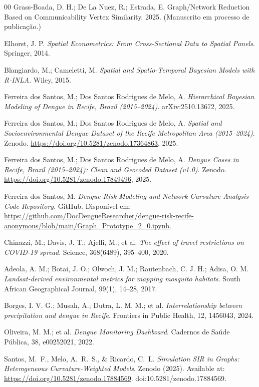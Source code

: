 \documentclass[final,3p,times,twocolumn]{elsarticle}
\begin{document}
\begin{thebibliography}{00}
Grass-Boada, D. H.; De La Nuez, R.; Estrada, E.
Graph/Network Reduction Based on Communicability Vertex Similarity.
2025. (Manuscrito em processo de publicação.)

Elhorst, J. P.
\textit{Spatial Econometrics: From Cross-Sectional Data to Spatial Panels}.
Springer, 2014.

Blangiardo, M.; Cameletti, M.
\textit{Spatial and Spatio-Temporal Bayesian Models with R-INLA}.
Wiley, 2015.

Ferreira dos Santos, M.; Dos Santos Rodrigues de Melo, A.
\textit{Hierarchical Bayesian Modeling of Dengue in Recife, Brazil (2015–2024)}.
arXiv:2510.13672, 2025.

Ferreira dos Santos, M.; Dos Santos Rodrigues de Melo, A.
\textit{Spatial and Socioenvironmental Dengue Dataset of the Recife Metropolitan Area (2015–2024)}.
Zenodo. \url{https://doi.org/10.5281/zenodo.17364863}, 2025.

Ferreira dos Santos, M.; Dos Santos Rodrigues de Melo, A.
\textit{Dengue Cases in Recife, Brazil (2015–2024): Clean and Geocoded Dataset (v1.0)}.
Zenodo. \url{https://doi.org/10.5281/zenodo.17849496}, 2025.

Ferreira dos Santos, M.
\textit{Dengue Risk Modeling and Network Curvature Analysis – Code Repository}.
GitHub. Disponível em:
\url{https://github.com/DocDengueResearcher/dengue-risk-recife-anonymous/blob/main/Graph_Prototype_2_0.ipynb}.

Chinazzi, M.; Davis, J. T.; Ajelli, M.; et al.
\textit{The effect of travel restrictions on COVID-19 spread}.
Science, 368(6489), 395--400, 2020.

Adeola, A. M.; Botai, J. O.; Olwoch, J. M.; Rautenbach, C. J. H.; Adisa, O. M.
\textit{Landsat-derived environmental metrics for mapping mosquito habitats}.
South African Geographical Journal, 99(1), 14--28, 2017.

Borges, I. V. G.; Musah, A.; Dutra, L. M. M.; et al.
\textit{Interrelationship between precipitation and dengue in Recife}.
Frontiers in Public Health, 12, 1456043, 2024.

Oliveira, M. M.; et al.
\textit{Dengue Monitoring Dashboard}.
Cadernos de Saúde Pública, 38, e00252021, 2022.

Santos, M.~F., Melo, A.~R.~S., \& Ricardo, C.~L.
\newblock \emph{Simulation SIR in Graphs: Heterogeneous Curvature-Weighted Models}.
\newblock Zenodo (2025).
\newblock Available at: \url{https://doi.org/10.5281/zenodo.17884569}.
\newblock doi:10.5281/zenodo.17884569.


\end{thebibliography}
\end{document}
